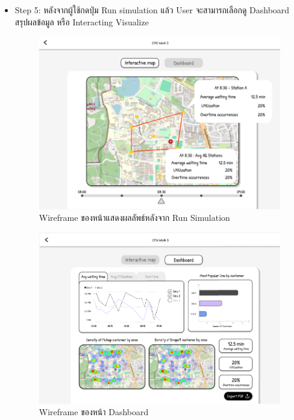 \begin{mypara}
\begin{itemize}
    \item Step 5: หลังจากผู้ใช้กดปุ่ม Run simulation แล้ว User จะสามารถเลือกดู  Dashboard สรุปผลข้อมูล 
    หรือ Interacting Visualize
      \begin{figure}[H]
        \centering
        \includegraphics[scale=0.4]{output_show.png}
        \caption{Wireframe ของหน้าแสดงผลลัพธ์หลังจาก Run Simulation}
        \label{fig:WireframeOutputGuest}
      \end{figure} 

      \begin{figure}[H]
        \centering
        \includegraphics[scale=0.4]{dashboard.png}
        \caption{Wireframe ของหน้า Dashboard }
        \label{fig:WireframeDashboardGuest}
      \end{figure}
    

\end{itemize}
\end{mypara}
